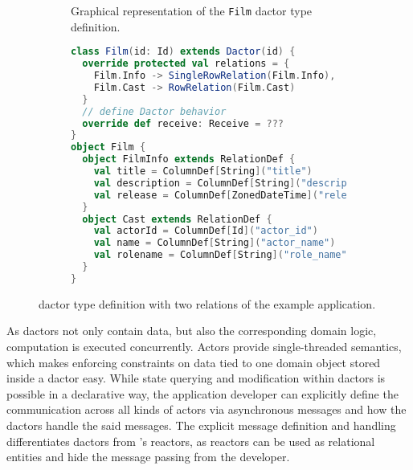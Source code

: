     \begin{figure}
      \centering

      \begin{subfigure}[b]{0.44\textwidth}
        \centering
        
        \caption{Graphical representation of the \texttt{Film} \gls{dactor} type definition.}
        \label{fig:film_diagram}
      \end{subfigure}\hfill
      \begin{subfigure}[b]{0.54\textwidth}
        \centering
        \scriptsize
\begin{lstlisting}[language=Scala]
class Film(id: Id) extends Dactor(id) {
  override protected val relations = {
    Film.Info -> SingleRowRelation(Film.Info),
    Film.Cast -> RowRelation(Film.Cast)
  }
  // define Dactor behavior
  override def receive: Receive = ???
}
object Film {
  object FilmInfo extends RelationDef {
    val title = ColumnDef[String]("title")
    val description = ColumnDef[String]("description")
    val release = ColumnDef[ZonedDateTime]("release")
  }
  object Cast extends RelationDef {
    val actorId = ColumnDef[Id]("actor_id")
    val name = ColumnDef[String]("actor_name")
    val rolename = ColumnDef[String]("role_name")
  }
}
\end{lstlisting}
        \label{lst:film_definition}
      \end{subfigure}
      \caption[\texttt{Film} Dactor type definition with two relations of the example application.]{ \gls{dactor} type definition with two relations of the example application.}
      \label{fig:film_dactor_definition}
    \end{figure}


  As \glspl{dactor} not only contain data, but also the corresponding domain logic, computation is executed concurrently.
  Actors provide single-threaded semantics, which makes enforcing constraints on data tied to one domain object stored inside a \gls{dactor} easy.
  While state querying and modification within \glspl{dactor} is possible in a declarative way, the application developer can explicitly define the communication across all kinds of actors via asynchronous messages and how the \glspl{dactor} handle the said messages.
  The explicit message definition and handling differentiates \glspl{dactor} from \citet{Shah:reactdb}'s reactors, as reactors can be used as relational entities and hide the message passing from the developer.


